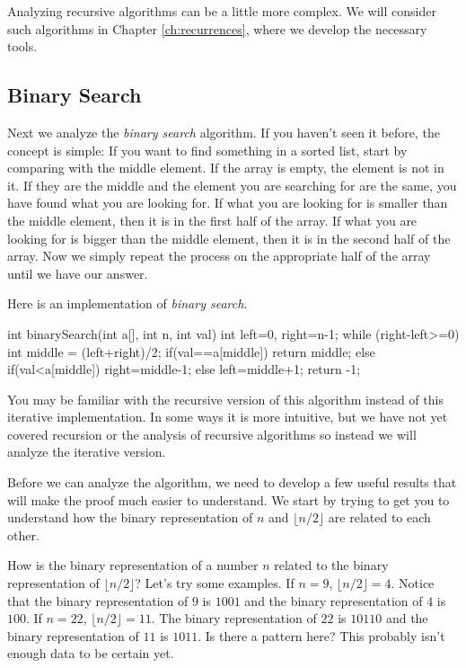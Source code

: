 Analyzing recursive algorithms can be a little more complex.  
We will consider such algorithms in Chapter \ref{ch:recurrences}, 
where we develop the necessary tools.

\subsection{Binary Search}\label{section:binarySearchAnalysis}
Next we analyze the {\em binary search} algorithm.  
If you haven't seen it before, the concept is simple: 
If you want to find something in a sorted list, start by comparing with the middle element.
If the array is empty, the element is not in it.
If they are the middle and the element you are searching for are the same, you have found what you are looking for.
If what you are looking for is smaller than the middle element, then it is in the first half of the array.
If what you are looking for is bigger than the middle element, then it is in the second half of the array.
Now we simply repeat the process on the appropriate half of the array until we have our answer.

\begin{exa}
Here is an implementation of {\em binary search}.
\begin{code}
    int binarySearch(int a[], int n, int val) {
       int left=0, right=n-1;
       while (right-left>=0) {
           int middle = (left+right)/2;
           if(val==a[middle]) 
               return middle;
           else if(val<a[middle]) 
               right=middle-1;
           else 
               left=middle+1; 
        }
       return -1;
    }
\end{code}
\end{exa}

You may be familiar with the
recursive version of this algorithm instead of this iterative implementation.
In some ways it is more intuitive, but we have not yet covered recursion
or the analysis of recursive algorithms so instead we will analyze the iterative version.

Before we can analyze the algorithm, we need to develop a few useful results that will make the
proof much easier to understand.
We start by trying to get you to understand how the binary representation of $n$ and
$\lfloor n/2\rfloor$ are related to each other.

\begin{exa}
How is the binary representation of a number $n$ related to the
binary representation of $\lfloor n/2\rfloor$?  Let's try some examples.
If $n=9$, $\lfloor n/2\rfloor=4$.  Notice that the binary representation of $9$ is $1001$
and the binary representation of $4$ is $100$.  
If $n=22$, $\lfloor n/2\rfloor=11$.  The binary representation of $22$ is $10110$
and the binary representation of $11$ is $1011$.  
Is there a pattern here?  This probably isn't enough data to be certain yet.  
\end{exa}

